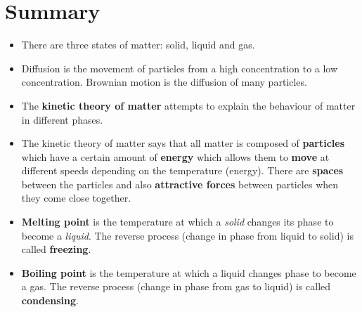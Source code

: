             \section{Summary}
            \nopagebreak
\label{m38730*id311034}\begin{itemize}[noitemsep]
            \label{m38730*id973}\item There are three states of matter: solid, liquid and gas.\label{m38730*id872}\item Diffusion is the movement of particles from a high concentration to a low concentration. Brownian motion is the diffusion of many particles.\label{m38730*uid80}\item The \textbf{kinetic theory of 
matter} attempts to explain the behaviour of matter in different 
phases.
\label{m38730*uid81}\item The kinetic theory of matter says that all matter is 
composed of \textbf{particles} which have a certain 
amount of \textbf{energy} which allows them to 
\textbf{move} at different speeds depending on the 
temperature (energy). There are \textbf{spaces} 
between the particles and also \textbf{attractive 
forces} between particles when they come close together.
\label{m38730*uid83}\item \textbf{Melting point} is the 
temperature at which a \textsl{solid} changes its 
phase to become a \textsl{liquid}. The reverse 
process (change in phase from liquid to solid) is called \textbf{freezing}.
\label{m38730*uid84}\item \textbf{Boiling point} is the 
temperature at which a liquid changes phase to become a gas. The reverse 
process (change in phase from gas to liquid) is called \textbf{condensing}. 
\end{itemize}
\label{m38730*cid9}
